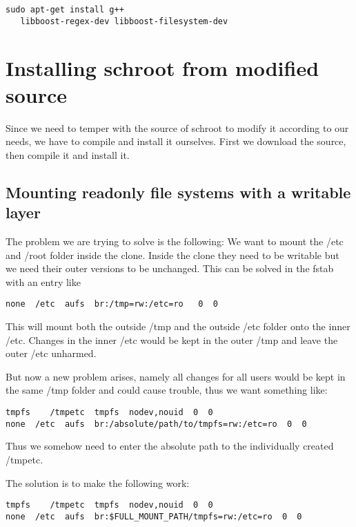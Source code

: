 \documentclass[a4paper]{book}
\begin{document}
\begin{verbatim}
sudo apt-get install g++
   libboost-regex-dev libboost-filesystem-dev
\end{verbatim}

\section{Installing schroot from modified source}
Since we need to temper with the source of schroot to modify it according to our needs, we have to compile and install it ourselves. First we download the source, then compile it and install it.
\subsection{Mounting readonly file systems with a writable layer}
The problem we are trying to solve is the following: We want to mount the /etc
and /root folder inside the clone. Inside the clone they need to be writable
but we need their outer versions to be unchanged.  This can be solved in the
fstab with an entry like

\begin{verbatim}
none  /etc  aufs  br:/tmp=rw:/etc=ro   0  0
\end{verbatim}

This will mount both the outside /tmp and the outside /etc folder onto the
inner /etc. Changes in the inner /etc would be kept in the outer /tmp and leave
the outer /etc unharmed.

But now a new problem arises, namely all changes for all users would be kept in
the same /tmp folder and could cause trouble, thus we want something like:

\begin{verbatim}
tmpfs    /tmpetc  tmpfs  nodev,nouid  0  0
none  /etc  aufs  br:/absolute/path/to/tmpfs=rw:/etc=ro  0  0
\end{verbatim}

Thus we somehow need to enter the absolute path to the individually created /tmpetc.

The solution is to make the following work:

\begin{verbatim}
tmpfs    /tmpetc  tmpfs  nodev,nouid  0  0
none  /etc  aufs  br:$FULL_MOUNT_PATH/tmpfs=rw:/etc=ro  0  0
\end{verbatim}
\end{document}
